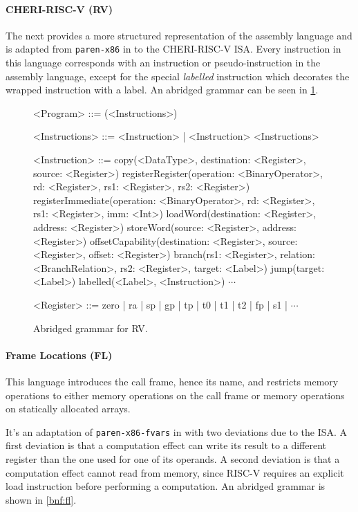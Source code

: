 \documentclass[main.tex]{subfiles}
\begin{document}
\paragraph{CHERI-RISC-V (RV)} The next \il{} provides a more structured representation of the assembly language and is adapted from \texttt{paren-x86} in \cite{:compcourse} to the CHERI-RISC-V ISA. Every instruction in this language corresponds with an instruction or pseudo-instruction in the assembly language, except for the special \emph{labelled} instruction which decorates the wrapped instruction with a label. An abridged grammar can be seen in \cref{bnf:rv}.
\begin{figure}[ht]
	\begin{grammar}
		
		<Program> ::= (<Instructions>)
		
		<Instructions> ::= <Instruction> | <Instruction> <Instructions>
		
		<Instruction> ::= copy(<DataType>, destination: <Register>, source: <Register>)
			\alt registerRegister(operation: <BinaryOperator>, rd: <Register>, rs1: <Register>, rs2: <Register>)
			\alt registerImmediate(operation: <BinaryOperator>, rd: <Register>, rs1: <Register>, imm: <Int>)
			\alt loadWord(destination: <Register>, address: <Register>)
			\alt storeWord(source: <Register>, address: <Register>)
			\alt offsetCapability(destination: <Register>, source: <Register>, offset: <Register>)
			\alt branch(rs1: <Register>, relation: <BranchRelation>, rs2: <Register>, target: <Label>)
			\alt jump(target: <Label>)
			\alt labelled(<Label>, <Instruction>)
			\alt $\cdots$
			
		<Register> ::= zero | ra | sp | gp | tp | t0 | t1 | t2 | fp | s1 | $\cdots$
		
	\end{grammar}
	\caption{Abridged grammar for RV.}
	\label{bnf:rv}
\end{figure}

\paragraph{Frame Locations (FL)} This language introduces the call frame, hence its name, and restricts memory operations to either memory operations on the call frame or memory operations on statically allocated arrays.

It's an adaptation of \texttt{paren-x86-fvars} in \cite{:compcourse} with two deviations due to the ISA. A first deviation is that a computation effect can write its result to a different register than the one used for one of its operands. A second deviation is that a computation effect cannot read from memory, since RISC-V requires an explicit load instruction before performing a computation. An abridged grammar is shown in \cref{bnf:fl}.
\end{document}
